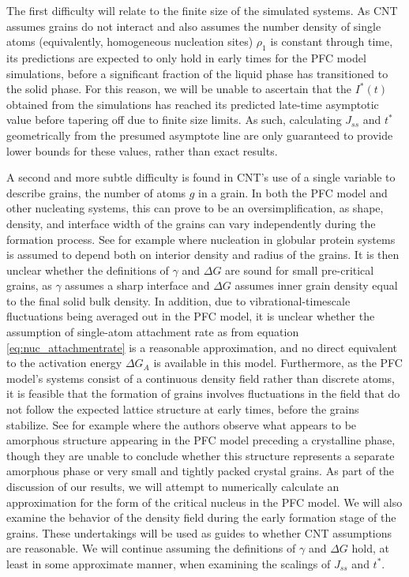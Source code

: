 The first difficulty will relate to the finite size of the simulated systems. As CNT assumes grains do not interact and also assumes the number density of single atoms (equivalently, homogeneous nucleation sites) $\rho_1$ is constant through time, its predictions are expected to only hold in early times for the PFC model simulations, before a significant fraction of the liquid phase has transitioned to the solid phase. For this reason, we will be unable to ascertain that the $I^*(t)$ obtained from the simulations has reached its predicted late-time asymptotic value before tapering off due to finite size limits. As such, calculating $J_{ss}$ and $t^*$ geometrically from the presumed asymptote line are only guaranteed to provide lower bounds for these values, rather than exact results.

A second and more subtle difficulty is found in CNT's use of a single variable to describe grains, the number of atoms $g$ in a grain. In both the PFC model and other nucleating systems, this can prove to be an oversimplification, as shape, density, and interface width of the grains can vary independently during the formation process. See for example \cite{lutsko15} where nucleation in globular protein systems is assumed to depend both on interior density and radius of the grains. It is then unclear whether the definitions of $\gamma$ and $\Delta G$ are sound for small pre-critical grains, as $\gamma$ assumes a sharp interface and $\Delta G$ assumes inner grain density equal to the final solid bulk density. In addition, due to vibrational-timescale fluctuations being averaged out in the PFC model, it is unclear whether the assumption of single-atom attachment rate as from equation \ref{eq:nuc_attachmentrate} is a reasonable approximation, and no direct equivalent to the activation energy $\Delta G_A$ is available in this model. Furthermore, as the PFC model's systems consist of a continuous density field rather than discrete atoms, it is feasible that the formation of grains involves fluctuations in the field that do not follow the expected lattice structure at early times, before the grains stabilize. See for example \cite{toth11} where the authors observe what appears to be amorphous structure appearing in the PFC model preceding a crystalline phase, though they are unable to conclude whether this structure represents a separate amorphous phase or very small and tightly packed crystal grains. As part of the discussion of our results, we will attempt to numerically calculate an approximation for the form of the critical nucleus in the PFC model. We will also examine the behavior of the density field during the early formation stage of the grains. These undertakings will be used as guides to whether CNT assumptions are reasonable. We will continue assuming the definitions of $\gamma$ and $\Delta G$ hold, at least in some approximate manner, when examining the scalings of $J_{ss}$ and $t^*$.


